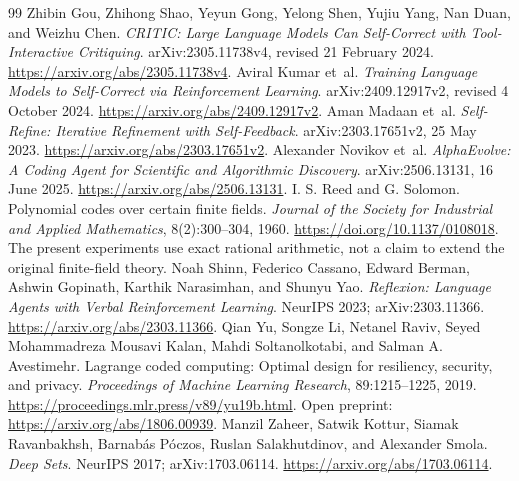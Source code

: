 \documentclass[11pt,letterpaper]{article}
\theoremstyle{remark}\newtheorem{remark}{Remark}[section]
\begin{document}
\begin{thebibliography}{99}
Zhibin Gou, Zhihong Shao, Yeyun Gong, Yelong Shen, Yujiu Yang, Nan Duan, and Weizhu Chen. \emph{CRITIC: Large Language Models Can Self-Correct with Tool-Interactive Critiquing}. arXiv:2305.11738v4, revised 21 February 2024. \url{https://arxiv.org/abs/2305.11738v4}.
Aviral Kumar et~al. \emph{Training Language Models to Self-Correct via Reinforcement Learning}. arXiv:2409.12917v2, revised 4 October 2024. \url{https://arxiv.org/abs/2409.12917v2}.
Aman Madaan et~al. \emph{Self-Refine: Iterative Refinement with Self-Feedback}. arXiv:2303.17651v2, 25 May 2023. \url{https://arxiv.org/abs/2303.17651v2}.
Alexander Novikov et~al. \emph{AlphaEvolve: A Coding Agent for Scientific and Algorithmic Discovery}. arXiv:2506.13131, 16 June 2025. \url{https://arxiv.org/abs/2506.13131}.
I. S. Reed and G. Solomon. Polynomial codes over certain finite fields. \emph{Journal of the Society for Industrial and Applied Mathematics}, 8(2):300--304, 1960. \url{https://doi.org/10.1137/0108018}. The present experiments use exact rational arithmetic, not a claim to extend the original finite-field theory.
Noah Shinn, Federico Cassano, Edward Berman, Ashwin Gopinath, Karthik Narasimhan, and Shunyu Yao. \emph{Reflexion: Language Agents with Verbal Reinforcement Learning}. NeurIPS 2023; arXiv:2303.11366. \url{https://arxiv.org/abs/2303.11366}.
Qian Yu, Songze Li, Netanel Raviv, Seyed Mohammadreza Mousavi Kalan, Mahdi Soltanolkotabi, and Salman A. Avestimehr. Lagrange coded computing: Optimal design for resiliency, security, and privacy. \emph{Proceedings of Machine Learning Research}, 89:1215--1225, 2019. \url{https://proceedings.mlr.press/v89/yu19b.html}. Open preprint: \url{https://arxiv.org/abs/1806.00939}.
Manzil Zaheer, Satwik Kottur, Siamak Ravanbakhsh, Barnabás Póczos, Ruslan Salakhutdinov, and Alexander Smola. \emph{Deep Sets}. NeurIPS 2017; arXiv:1703.06114. \url{https://arxiv.org/abs/1703.06114}.
\end{thebibliography}
\end{document}
